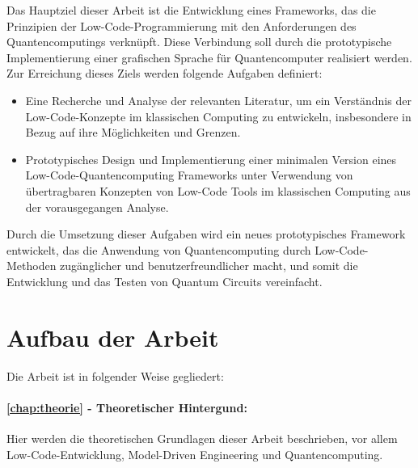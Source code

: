 Das Hauptziel dieser Arbeit ist die Entwicklung eines Frameworks, das
die Prinzipien der Low-Code-Programmierung mit den Anforderungen des
Quantencomputings verknüpft. Diese Verbindung soll durch die
prototypische Implementierung einer grafischen Sprache für
Quantencomputer realisiert werden. Zur Erreichung dieses Ziels werden
folgende Aufgaben definiert:

\begin{itemize}
\item
  Eine Recherche und Analyse der relevanten Literatur, um ein
  Verständnis der Low-Code-Konzepte im klassischen Computing zu
  entwickeln, insbesondere in Bezug auf ihre Möglichkeiten und Grenzen.
\item
  Prototypisches Design und Implementierung einer minimalen Version
  eines Low-Code-Quantencomputing Frameworks unter Verwendung von
  übertragbaren Konzepten von Low-Code Tools im klassischen Computing
  aus der vorausgegangen Analyse.
\end{itemize}

Durch die Umsetzung dieser Aufgaben wird ein neues prototypisches
Framework entwickelt, das die Anwendung von Quantencomputing durch
Low-Code-Methoden zugänglicher und benutzerfreundlicher macht, und somit
die Entwicklung und das Testen von Quantum Circuits vereinfacht.




\section*{Aufbau der Arbeit}

Die Arbeit ist in folgender Weise gegliedert:
\paragraph{\cref{chap:theorie} - Theoretischer Hintergund:} Hier werden die theoretischen Grundlagen dieser Arbeit beschrieben, vor 
allem Low-Code-Entwicklung, Model-Driven Engineering und Quantencomputing.

